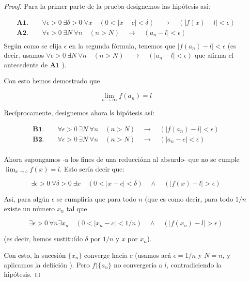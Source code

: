 \documentclass[12pt,a4paper]{extarticle}
\begin{document}
\begin{proof}
Para la primer parte de la prueba designemos las hip\'otesis as\'i:

\begin{align*}
&\textbf{A1.} \qquad  \forall \epsilon > 0 \ \exists \delta > 0 \ \forall x \quad
(0<|x-c|< \delta) \quad \to \quad (|f(x) - l| < \epsilon) & \\
&\textbf{A2.} \qquad \forall \epsilon > 0 \ \exists N \ \forall n \quad  (n > N) \quad \to \quad (a_n - l| < \epsilon) & \\
\end{align*}
Seg\'un como se elija \( \epsilon \) en la segunda f\'ormula, tenemos
que \( | f(a_n) - l | < \epsilon \) (es decir, usamos \( \forall \epsilon > 0 \ \exists N \ \forall n
\quad  (n > N) \quad \to \quad (|a_n - l| < \epsilon) \)
que afirma el antecedente de \( \textbf{A1} \) ).

Con esto hemos demostrado que

\[ \lim_{n \to \infty} f( a_n )= l \]

Rec\'iprocamente, designemos ahora ls hip\'otesis as\'i:

\begin{align*}
& \textbf{B1.} \qquad
 \forall \epsilon > 0 \ \exists N \ \forall n \quad  (n > N) \quad
\to \quad ( |f(a_n) - l| < \epsilon) & \\
& \textbf{B2.} \qquad
 \forall \epsilon > 0 \ \exists N \ \forall n \quad  (n > N) \quad
\to \quad ( |a_n - c| < \epsilon) & \\
\end{align*}

Ahora supongamos -a los fines de una reducci\'onn al absurdo- que no
se cumple \( \lim_{x \to c} f( x )= l \). Esto ser\'ia decir que:

\[ \exists \epsilon > 0 \ \forall \delta > 0 \ \exists x \quad
(0<|x-c|< \delta) \quad \wedge \quad (|f(x) - l| > \epsilon) \]

As\'i, para alg\'un \( \epsilon \) se cumplir\'ia que para todo \( n
\) (que es como decir, para todo \( 1/n \) existe un n\'umero \( x_n
\) tal que

\[ \exists \epsilon > 0 \ \forall n \exists x_n \quad
(0<|x_n-c|< 1/n) \quad \wedge \quad (|f(x_n) - l| > \epsilon) \]

(es decir, hemos sustitu\'ido \( \delta \) por \( 1/n \) y \( x \) por
\( x_n \)).

Con esto, la sucesi\'on \( \{ x_n \} \) converge hacia \( c \) (usamos
ac\'a \( \epsilon = 1/n \) y \( N = n \), y aplicamos la defiici\'on
). Pero \( f( \{ a_n \} \) no converger\'ia a \( l \),
contradiciendo la hip\'otesis.
\end{proof}
\end{document}
